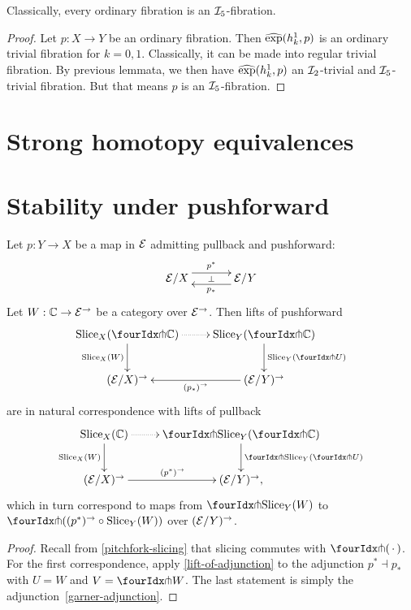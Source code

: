 \documentclass[reqno,10pt,a4paper,oneside]{amsart}
\begin{document}
\begin{lemma}
Classically, every ordinary fibration is an $\cal{I}_5$-fibration.
\end{lemma}

\begin{proof}
Let $p : X \to Y$ be an ordinary fibration.
Then $\hatexp(h_k^1, p)$ is an ordinary trivial fibration for $k = 0, 1$.
Classically, it can be made into regular trivial fibration.
By previous lemmata, we then have $\hatexp(h_k^1, p)$ an $\cal{I}_2$-trivial and $\cal{I}_5$-trivial fibration.
But that means $p$ is an $\cal{I}_5$-fibration.
\end{proof}


\section{Strong homotopy equivalences}

\newpage






\section{Stability under pushforward}

\begin{lemma}
\label{lift-dependent-product}
Let $p : Y \to X$ be a map in $\catE$ admitting pullback and pushforward:
\[
\xymatrix@C+1em{
  \catE/X
  \ar@<5pt>[r]^{p^*}
  \ar@{}[r]|{\bot}
&
  \catE/Y
  \ar@<5pt>[l]^{p_*}
}
\]
Let $W : \cat{C} \to \catE^{\to}$ be a category over $\catE^{\to}$.
Then lifts of pushforward
\[
\xymatrix{
  \Slice_X(\liftr{\cat{C}})
  \ar@{.>}[r]
  \ar[d]_{\Slice_X(W)}
&
  \Slice_Y(\liftr{\cat{C}})
  \ar[d]^{\Slice_Y(\liftr{U})}
\\
  (\catE/X)^{\to}
&
  (\catE/Y)^{\to}
  \ar[l]^{(p_*)^{\to}}
}
\]
are in natural correspondence with lifts of pullback
\[
\xymatrix{
  \Slice_X(\cat{C})
  \ar@{.>}[r]
  \ar[d]_{\Slice_X(W)}
&
  \liftl{\Slice_Y(\liftr{\cat{C}})}
  \ar[d]^{\liftl{\Slice_Y(\liftr{U})}}
\\
  (\catE/X)^{\to}
  \ar[r]^{(p^*)^{\to}}
&
  (\catE/Y)^{\to},
}
\]
which in turn correspond to maps from $\liftr{\Slice_Y(W)}$ to $\liftr{((p^*)^{\to} \cc \Slice_Y(W))}$ over $(\catE/Y)^{\to}$.
\end{lemma}

\begin{proof}
Recall from \cref{pitchfork-slicing} that slicing commutes with $\liftr{\brarghole}$.
For the first correspondence, apply \cref{lift-of-adjunction} to the adjunction $p^* \dashv p_*$ with $U = W$ and $V = \liftr{W}$.
The last statement is simply the adjunction~\eqref{garner-adjunction}.
\end{proof}





\end{document}
